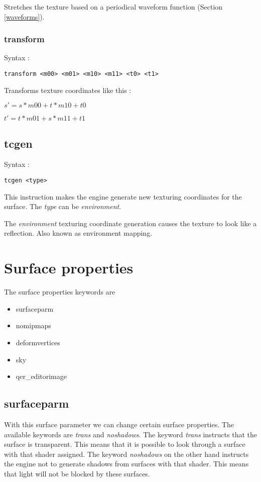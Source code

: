 \documentclass[12pt, titlepage]{amsart}
\begin{document}
Stretches the texture based on a periodical waveform function (Section \ref{waveforms}).

\subsubsection{transform}
Syntax :
\begin{verbatim}
transform <m00> <m01> <m10> <m11> <t0> <t1>
\end{verbatim}

Transforms texture coordinates like this :

\begin{center}
$s' = s * m00 + t * m10 + t0$

$t' = t * m01 + s * m11 + t1$
\end{center}

\subsection{tcgen}
Syntax :
\begin{verbatim}
tcgen <type>
\end{verbatim}

This instruction makes the engine generate new texturing coordinates for
the surface. The \textit{type} can be \textit{environment}.

The \textit{environment} texturing coordinate generation causes the
texture to look like a reflection. Also known as environment mapping.

\section{Surface properties}
The surface properties keywords are
\begin{itemize}
\item surfaceparm
\item nomipmaps
\item deformvertices
\item sky
\item qer\_editorimage
\end{itemize}

\subsection{surfaceparm}
With this surface parameter we can change certain surface properties.
The available keywords are \textit{trans} and \textit{noshadows}.
The keyword \textit{trans} instructs that the surface is transparent. This
means that it is possible to look through a surface with that shader
assigned. The keyword \textit{noshadows} on the other hand instructs
the engine not to generate shadows from surfaces with that shader. This
means that light will not be blocked by these surfaces.
\end{document}
